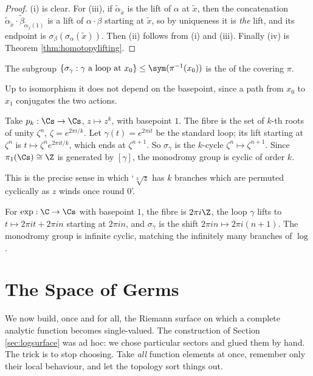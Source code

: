 \begin{proof}
	(i) is clear. For (iii), if $\tilde\alpha_{\tilde x}$ is the lift of $\alpha$ at
	$\tilde x$, then the concatenation $\tilde\alpha_{\tilde x} \cdot
	\tilde\beta_{\tilde\alpha_{\tilde x}(1)}$ is a lift of $\alpha\cdot\beta$ starting at
	$\tilde x$, so by uniqueness it is \emph{the} lift, and its endpoint is
	$\sigma_\beta(\sigma_\alpha(\tilde x))$. Then (ii) follows from (i) and (iii). Finally
	(iv) is Theorem \ref{thm:homotopylifting}.
\end{proof}

\begin{definition}
	The subgroup $\{\sigma_\gamma : \gamma \text{ a loop at } x_0\} \leq \sym(\pi^{-1}(x_0))$
	is the  of the covering $\pi$.
\end{definition}

Up to isomorphism it does not depend on the basepoint, since a path from $x_0$ to $x_1$
conjugates the two actions.

\begin{example}\label{ex:monodromypk}
	Take $p_k : \Cs \to \Cs$, $z \mapsto z^k$, with basepoint $1$. The fibre is the set of
	$k$-th roots of unity $\zeta^n$, $\zeta = e^{2\pi i /k}$. Let $\gamma(t) = e^{2\pi i t}$
	be the standard loop; its lift starting at $\zeta^n$ is
	$t \mapsto \zeta^n e^{2\pi i t /k}$, which ends at $\zeta^{n+1}$. So $\sigma_\gamma$ is
	the $k$-cycle $\zeta^n \mapsto \zeta^{n+1}$. Since $\pi_1(\Cs) \cong \Z$ is generated by
	$[\gamma]$, the monodromy group is cyclic of order $k$.

	This is the precise sense in which `$\sqrt[k]{z}$ has $k$ branches which are permuted
	cyclically as $z$ winds once round $0$'.
\end{example}

\begin{example}
	For $\exp : \C \to \Cs$ with basepoint $1$, the fibre is $2\pi i \Z$, the loop $\gamma$
	lifts to $t \mapsto 2\pi i t + 2\pi i n$ starting at $2\pi i n$, and
	$\sigma_\gamma$ is the shift $2\pi i n \mapsto 2\pi i (n+1)$. The monodromy group is
	infinite cyclic, matching the infinitely many branches of $\log$.
\end{example}

\section{The Space of Germs}\label{sec:germs}

We now build, once and for all, the Riemann surface on which a complete analytic function
becomes single-valued. The construction of Section \ref{sec:logsurface} was ad hoc: we
chose particular sectors and glued them by hand. The trick is to stop choosing. Take
\emph{all} function elements at once, remember only their local behaviour, and let the
topology sort things out.

